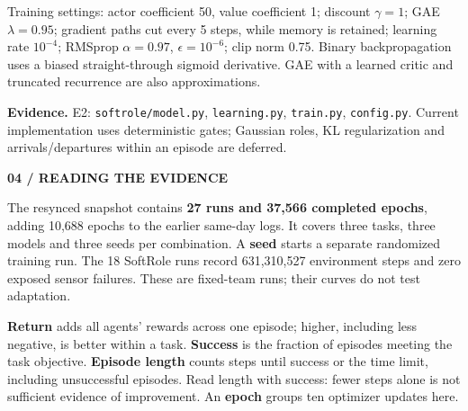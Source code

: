 \documentclass[11pt,letterpaper]{article}
\newcommand{\eyebrow}[1]{{\small\bfseries\color{teal}#1}\par\vspace{3pt}}
\newcommand{\pagetitle}[2]{\eyebrow{#1}{\fontsize{25}{28}\selectfont\bfseries #2\par}\vspace{7pt}}
\newcommand{\evidence}[1]{\vfill{\fontsize{8.4}{10.5}\selectfont\color{muted}\textbf{Evidence.} #1\par}}
\newcommand{\captiontext}[1]{\par{\fontsize{9}{11}\selectfont\color{muted}#1\par}}
\newcommand{\code}[1]{\nolinkurl{#1}}
\begin{document}
\captiontext{Training settings: actor coefficient 50, value coefficient 1; discount $\gamma=1$; GAE $\lambda=0.95$; gradient paths cut every 5 steps, while memory is retained; learning rate $10^{-4}$; RMSprop $\alpha=0.97$, $\epsilon=10^{-6}$; clip norm 0.75. Binary backpropagation uses a biased straight-through sigmoid derivative. GAE with a learned critic and truncated recurrence are also approximations.}
\evidence{E2: \code{softrole/model.py}, \code{learning.py}, \code{train.py}, \code{config.py}. Current implementation uses deterministic gates; Gaussian roles, KL regularization and arrivals/departures within an episode are deferred.}
\endgroup

\newpage
\pagetitle{04 / READING THE EVIDENCE}{What the comparison can tell us}
The resynced snapshot contains \textbf{27 runs and 37,566 completed epochs}, adding 10,688 epochs to the earlier same-day logs. It covers three tasks, three models and three seeds per combination. A \textbf{seed} starts a separate randomized training run. The 18 SoftRole runs record 631,310,527 environment steps and zero exposed sensor failures. These are fixed-team runs; their curves do not test adaptation.

\textbf{Return} adds all agents' rewards across one episode; higher, including less negative, is better within a task. \textbf{Success} is the fraction of episodes meeting the task objective. \textbf{Episode length} counts steps until success or the time limit, including unsuccessful episodes. Read length with success: fewer steps alone is not sufficient evidence of improvement. An \textbf{epoch} groups ten optimizer updates here.
\end{document}
